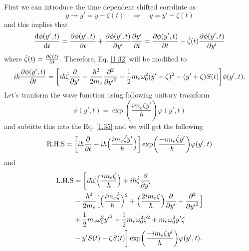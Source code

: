 \documentclass[a4paper]{article}
\numberwithin{equation}{subsection}
\numberwithin{equation}{section}
\begin{document}
\noindent
First we can introduce the time dependent shifted corrdinte as
\begin{equation} \label{1.33}
    y \rightarrow y' = y - \zeta(t) \quad \Rightarrow \quad
    y = y' + \zeta(t)
\end{equation}
and this implies that
\begin{equation} \label{1.34}
    \dv{\phi(y',t)}{t} = \pdv{\phi(y',t)}{t} + \pdv{\phi(y',t)}{y'}\pdv{y'}{t} =
    \pdv{\phi(y',t)}{t} - \dot{\zeta}(t)\pdv{\phi(y',t)}{y'}
\end{equation}
where $\dot{\zeta}(t) = \pdv{\zeta(t)}{t}$.
Therefore, Eq. \eqref{1.32} will be modified to
\begin{equation} \label{1.35}
  \begin{aligned}
    i \hbar \pdv{\phi(y',t)}{t}  =
    \bigg[
    i \hbar\dot{\zeta}\pdv{y'}
    -
    \frac{\hbar^2}{2m_e}
    \pdv[2]{{y'}} +
    \frac{1}{2}m_e \omega_0^2(y' + \zeta)^2
    - (y' + \zeta) S(t)
    \bigg]
    \phi(y',t).
  \end{aligned}
\end{equation}
Let's tranform the wave function using following unitary trasnform
\begin{equation} \label{1.36}
    \phi(y',t) = \exp(\frac{im_e\dot{\zeta}y'}{\hbar})\varphi(y',t)
\end{equation}
and subtitte this into the Eq. \eqref{1.35} and we will get the following
\begin{equation} \label{1.37}
  \text{R.H.S} =  \bigg[ i \hbar \pdv{t} -
i \hbar \Big(\frac{im_e \ddot{\zeta} y'}{\hbar}\Big)\bigg]  \exp(\frac{-im_e\dot{\zeta}y'}{\hbar})\varphi(y',t)
\end{equation}
and
\begin{equation} \label{1.38}
  \begin{aligned}
    \text{L.H.S} & =  \bigg[
      i \hbar \dot{\zeta}  \Big(\frac{im_e \dot{\zeta}}{\hbar}\Big)  +
      i \hbar \dot{\zeta} \pdv{y'} \\
      &
      -
      \frac{\hbar^2}{2m_e}\Big[
        \Big(\frac{im_e \dot{\zeta}}{\hbar}\Big)^2
        + \Big(\frac{2im_e \dot{\zeta}}{\hbar}\Big) \pdv{{y'}}
        + \pdv[2]{{y'}}
      \Big] \\
      &
      +\frac{1}{2}m_e\omega_0^2 {y'}^2 + \frac{1}{2}m_e\omega_0^2 \zeta^2 +
      m_e\omega_0^2 y'\zeta \\
      & -
      y'S(t) - \zeta S(t)
    \bigg]  \exp(\frac{-im_e\dot{\zeta}y'}{\hbar})\varphi(y',t).
  \end{aligned}
\end{equation}
\end{document}

